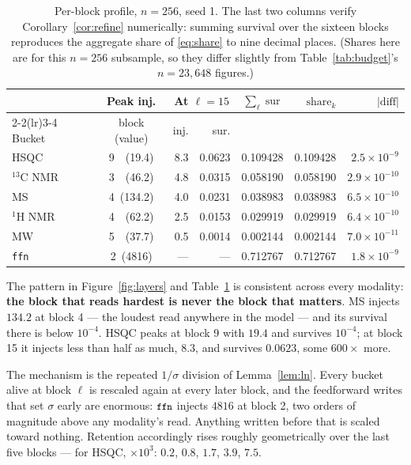 \documentclass[11pt]{article}
\theoremstyle{plain}
\theoremstyle{remark}
\newcommand{\code}[1]{\texttt{\small #1}}
\begin{document}
\begin{table}[htbp]
\centering
\small
\caption{Per-block profile, $n = 256$, seed 1. The last two columns verify
Corollary~\ref{cor:refine} numerically: summing survival over the sixteen
blocks reproduces the aggregate share of \eqref{eq:share} to nine decimal
places. (Shares here are for this $n = 256$ subsample, so they differ slightly
from Table~\ref{tab:budget}'s $n = 23{,}648$ figures.)}
\label{tab:perlayer}
\begin{tabular}{@{}l c r r r r r@{}}
\toprule
& Peak inj. & \multicolumn{2}{c}{At $\ell = 15$} & $\sum_\ell \operatorname{sur}$ & $\text{share}_k$ & $|\text{diff}|$ \\
\cmidrule(lr){2-2}\cmidrule(lr){3-4}
Bucket & block (value) & inj. & sur. & & & \\
\midrule
HSQC & 9\ \ (19.4) & 8.3 & 0.0623 & 0.109428 & 0.109428 & $2.5\times10^{-9}$ \\
$^{13}$C NMR & 3\ \ (46.2) & 4.8 & 0.0315 & 0.058190 & 0.058190 & $2.9\times10^{-10}$ \\
MS & 4\ (134.2) & 4.0 & 0.0231 & 0.038983 & 0.038983 & $6.5\times10^{-10}$ \\
$^{1}$H NMR & 4\ \ (62.2) & 2.5 & 0.0153 & 0.029919 & 0.029919 & $6.4\times10^{-10}$ \\
MW & 5\ \ (37.7) & 0.5 & 0.0014 & 0.002144 & 0.002144 & $7.0\times10^{-11}$ \\
\code{ffn} & 2\ (4816) & --- & --- & 0.712767 & 0.712767 & $1.8\times10^{-9}$ \\
\bottomrule
\end{tabular}
\end{table}

\noindent
The pattern in Figure~\ref{fig:layers} and Table~\ref{tab:perlayer} is
consistent across every modality: \textbf{the block that reads hardest is
never the block that matters}. MS injects $134.2$ at block 4 --- the loudest
read anywhere in the model --- and its survival there is below $10^{-4}$. HSQC
peaks at block 9 with $19.4$ and survives $10^{-4}$; at block 15 it injects
less than half as much, $8.3$, and survives $0.0623$, some $600\times$ more.

The mechanism is the repeated $1/\sigma$ division of Lemma~\ref{lem:ln}. Every
bucket alive at block $\ell$ is rescaled again at every later block, and the
feedforward writes that set $\sigma$ early are enormous: $\code{ffn}$ injects
$4816$ at block 2, two orders of magnitude above any modality's read. Anything
written before that is scaled toward nothing. Retention accordingly rises
roughly geometrically over the last five blocks --- for HSQC, $\times10^3$:
$0.2$, $0.8$, $1.7$, $3.9$, $7.5$.
\end{document}
